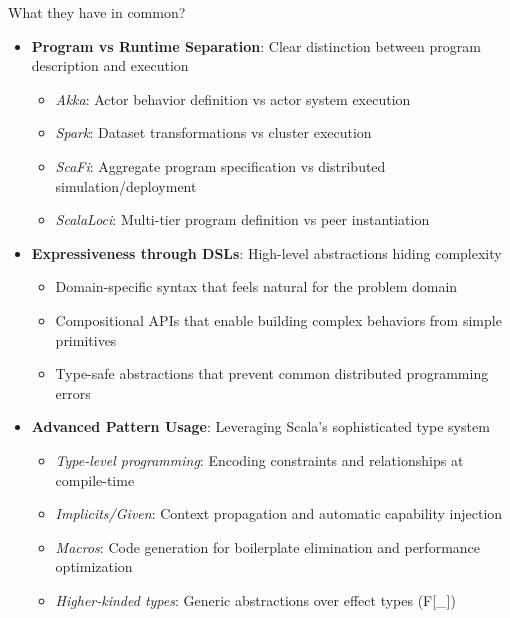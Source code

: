 \documentclass[presentation, 9pt]{beamer}\mode<presentation>{\usetheme{AMSBolognaFC}}
\begin{document}
\begin{frame}{What they have in common?}
	\begin{itemize}
		\item \textbf{Program vs Runtime Separation}: Clear distinction between program description and execution
		\begin{itemize}
			\item \emph{Akka}: Actor behavior definition vs actor system execution
			\item \emph{Spark}: Dataset transformations vs cluster execution
			\item \emph{ScaFi}: Aggregate program specification vs distributed simulation/deployment
			\item \emph{ScalaLoci}: Multi-tier program definition vs peer instantiation
		\end{itemize}
		\item \textbf{Expressiveness through DSLs}: High-level abstractions hiding complexity
		\begin{itemize}
			\item Domain-specific syntax that feels natural for the problem domain
			\item Compositional APIs that enable building complex behaviors from simple primitives
			\item Type-safe abstractions that prevent common distributed programming errors
		\end{itemize}
		\item \textbf{Advanced Pattern Usage}: Leveraging Scala's sophisticated type system
		\begin{itemize}
			\item \emph{Type-level programming}: Encoding constraints and relationships at compile-time
			\item \emph{Implicits/Given}: Context propagation and automatic capability injection
			\item \emph{Macros}: Code generation for boilerplate elimination and performance optimization
			\item \emph{Higher-kinded types}: Generic abstractions over effect types (F[\_])
		\end{itemize}
	\end{itemize}
\end{frame}
\frame{\titlepage}

\section*{\refname}

\begin{frame}{\refname}
	\tiny
	\nocite{*}
	\printbibliography
\end{frame}

\end{document}

